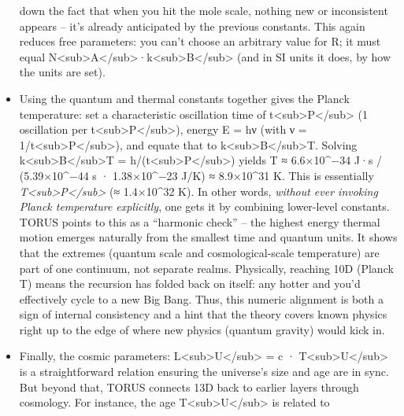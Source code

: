 \documentclass[
]{article}
\begin{document}
\begin{itemize}
  down the fact that when you hit the mole scale, nothing new or
  inconsistent appears -- it's already anticipated by the previous
  constants\hspace{0pt}. This again reduces free parameters: you can't
  choose an arbitrary value for R; it must equal
  N\textless sub\textgreater A\textless/sub\textgreater·k\textless sub\textgreater B\textless/sub\textgreater{}
  (and in SI units it does, by how the units are set).
\item
  Using the quantum and thermal constants together gives the Planck
  temperature: set a characteristic oscillation time of
  t\textless sub\textgreater P\textless/sub\textgreater{} (1 oscillation
  per t\textless sub\textgreater P\textless/sub\textgreater), energy E =
  hν (with ν = 1/t\textless sub\textgreater P\textless/sub\textgreater),
  and equate that to
  k\textless sub\textgreater B\textless/sub\textgreater T. Solving
  k\textless sub\textgreater B\textless/sub\textgreater T =
  h/(t\textless sub\textgreater P\textless/sub\textgreater) yields T ≈
  6.6×10\^{}−34 J·s / (5.39×10\^{}−44 s · 1.38×10\^{}−23 J/K) ≈
  8.9×10\^{}31 K\hspace{0pt}. This is essentially
  \emph{T\textless sub\textgreater P\textless/sub\textgreater{}} (≈
  1.4×10\^{}32 K)\hspace{0pt}. In other words, \emph{without ever
  invoking Planck temperature explicitly}, one gets it by combining
  lower-level constants. TORUS points to this as a ``harmonic check'' --
  the highest energy thermal motion emerges naturally from the smallest
  time and quantum units\hspace{0pt}. It shows that the extremes
  (quantum scale and cosmological-scale temperature) are part of one
  continuum, not separate realms. Physically, reaching 10D (Planck T)
  means the recursion has folded back on itself: any hotter and you'd
  effectively cycle to a new Big Bang. Thus, this numeric alignment is
  both a sign of internal consistency and a hint that the theory covers
  known physics right up to the edge of where new physics (quantum
  gravity) would kick in.
\item
  Finally, the cosmic parameters:
  L\textless sub\textgreater U\textless/sub\textgreater{} = c ·
  T\textless sub\textgreater U\textless/sub\textgreater{} is a
  straightforward relation ensuring the universe's size and age are in
  sync\hspace{0pt}. But beyond that, TORUS connects 13D back to earlier
  layers through cosmology. For instance, the age
  T\textless sub\textgreater U\textless/sub\textgreater{} is related to

\end{itemize}
\end{document}
